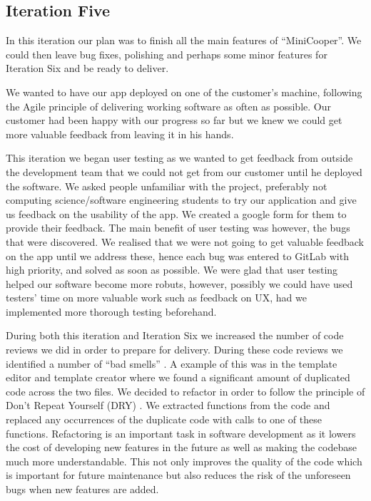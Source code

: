 \documentclass{l3proj}
\begin{document}
\subsection{Iteration Five}

In this iteration our plan was to finish all the main features of ``MiniCooper''. We could then leave bug fixes, polishing and perhaps some minor features for Iteration Six and be ready to deliver.

We wanted to have our app deployed on one of the customer’s machine, following the Agile principle of delivering working software as often as possible. \cite{agilewebsite} Our customer had been happy with our progress so far but we knew we could get more valuable feedback from leaving it in his hands.  

This iteration we began user testing as we wanted to get feedback from outside the development team that we could not get from our customer until he deployed the software. We asked people unfamiliar with the project, preferably not computing science/software engineering students to try our application and give us feedback on the usability of the app. We created a google form for them to provide their feedback. The main benefit of user testing was however, the bugs that were discovered. We realised that we were not going to get valuable feedback on the app until we address these, hence each bug was entered to GitLab with high priority, and solved as soon as possible.
We were glad that user testing helped our software become more robuts, however, possibly we could have used testers' time on more valuable work such as feedback on UX, had we implemented more thorough testing beforehand.

During both this iteration and Iteration Six we increased the number of code reviews we did in order to prepare for delivery. During these code reviews we identified a number of ``bad smells'' \cite{Fowler}. A example of this was in the template editor and template creator where we found a significant amount of duplicated code across the two files. We decided to refactor in order to follow the principle of Don’t Repeat Yourself (DRY) \cite{HuntThomas}. We extracted functions from the code and replaced any occurrences of the duplicate code with calls to one of these functions. Refactoring is an important task in software development as it lowers the cost of developing new features in the future as well as making the codebase much more understandable. This not only improves the quality of the code which is important for future maintenance but also reduces the risk of the unforeseen bugs when new features are added.
\end{document}
